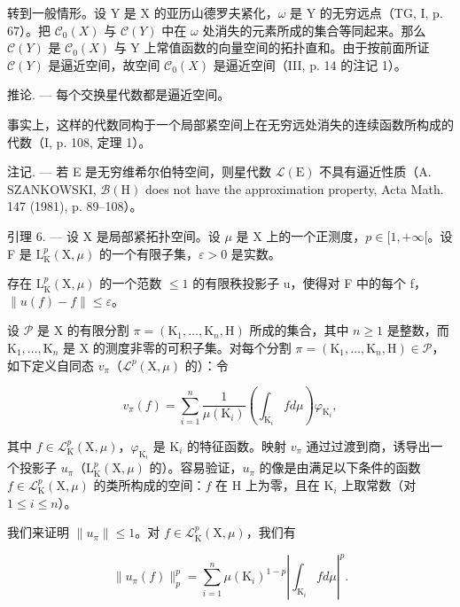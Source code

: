 转到一般情形。设 Y 是 X 的亚历山德罗夫紧化，\(\omega\) 是 Y 的无穷远点（TG, I, p. 67）。把 \(\mathcal{C}_{0}(X)\) 与 \(\mathcal{C}(Y)\) 中在 \(\omega\) 处消失的元素所成的集合等同起来。那么 \(\mathcal{C}(Y)\) 是 \(\mathcal{C}_{0}(X)\) 与 Y 上常值函数的向量空间的拓扑直和。由于按前面所证 \(\mathcal{C}(Y)\) 是逼近空间，故空间 \(\mathcal{C}_{0}(X)\) 是逼近空间（III, p. 14 的注记 1）。

推论. --- 每个交换星代数都是逼近空间。

事实上，这样的代数同构于一个局部紧空间上在无穷远处消失的连续函数所构成的代数（I, p. 108, 定理 1）。

注记. --- 若 E 是无穷维希尔伯特空间，则星代数 \(\mathcal{L}(\mathrm{E})\) 不具有逼近性质（A. SZANKOWSKI, \(\mathcal{B}(\mathrm{H})\) does not have the approximation property, Acta Math. 147 (1981), p. 89--108）。

引理 6. --- 设 X 是局部紧拓扑空间。设 \(\mu\) 是 X 上的一个正测度，\(p \in [1, +\infty[\)。设 F 是 \(\mathrm{L}_{\mathrm{K}}^{p}(\mathrm{X}, \mu)\) 的一个有限子集，\(\varepsilon > 0\) 是实数。

存在 \(\mathrm{L}_{\mathrm{K}}^{p}(\mathrm{X},\mu)\) 的一个范数 \(\leqslant 1\) 的有限秩投影子 u，使得对 F 中的每个 f，\(\|u(f)-f\|\leqslant\varepsilon\)。

设 \(\mathcal{P}\) 是 X 的有限分割 \(\pi = (\mathrm{K}_1, \ldots, \mathrm{K}_n, \mathrm{H})\) 所成的集合，其中 \(n \geqslant 1\) 是整数，而 \(\mathrm{K}_1, \ldots, \mathrm{K}_n\) 是 X 的测度非零的可积子集。对每个分割 \(\pi = (\mathrm{K}_1, \ldots, \mathrm{K}_n, \mathrm{H}) \in \mathcal{P}\)，如下定义自同态 \(v_\pi\)（\(\mathcal{L}^p(\mathrm{X}, \mu)\) 的）：令

\[
v _ {\pi} (f) = \sum_ {i = 1} ^ {n} \frac {1}{\mu (\mathrm{K} _ {i})} \left(\int_ {\mathrm{K} _ {i}} f d \mu\right) \varphi_ {\mathrm{K} _ {i}},
\]

其中 \(f \in \mathcal{L}_{\mathrm{K}}^{p}(\mathrm{X}, \mu)\)，\(\varphi_{\mathrm{K}_i}\) 是 \(\mathrm{K}_i\) 的特征函数。映射 \(v_\pi\) 通过过渡到商，诱导出一个投影子 \(u_\pi\)（\(\mathrm{L}_{\mathrm{K}}^{p}(\mathrm{X}, \mu)\) 的）。容易验证，\(u_\pi\) 的像是由满足以下条件的函数 \(f \in \mathcal{L}_{\mathrm{K}}^{p}(\mathrm{X}, \mu)\) 的类所构成的空间：\(f\) 在 H 上为零，且在 \(\mathrm{K}_i\) 上取常数（对 \(1 \leqslant i \leqslant n\)）。

我们来证明 \(\| u_{\pi}\| \leqslant 1\)。对 \(f\in \mathcal{L}_{\mathrm{K}}^{p}(\mathrm{X},\mu)\)，我们有

\[
\| u _ {\pi} (f) \| _ {p} ^ {p} = \sum_ {i = 1} ^ {n} \mu (\mathrm{K} _ {i}) ^ {1 - p} \left| \int_ {\mathrm{K} _ {i}} f d \mu \right| ^ {p}.
\]

